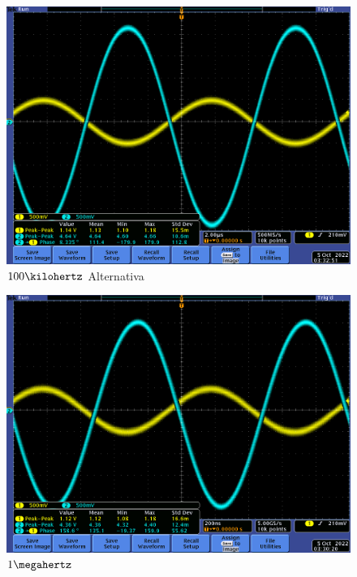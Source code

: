 \documentclass[12pt,letterpaper]{article}     %
\begin{document}
{\begin{figure}[!ht]
\centering
\includegraphics[scale=0.5]{imagenes/19.png}
\caption{$100\kilohertz$ Alternativa}
\label{fig:19}
\end{figure}

\begin{figure}[!ht]
\centering
\includegraphics[scale=0.5]{imagenes/17.png}
\caption{$1\megahertz$}
\label{fig:17}
\end{figure}

}
\end{document}
